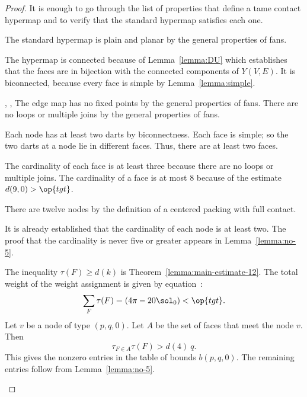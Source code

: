 \begin{proof} It is enough to go through the list of properties that
  define a tame contact hypermap and to verify that the standard
  hypermap satisfies each one.

\begin{nomerate}
\item {} The standard hypermap is plain and planar by the
  general properties of fans.
\item {} The hypermap is connected because of
  Lemma~\ref{lemma:DU} which establishes that the faces are in
  bijection with the connected components of $Y(V,E)$.  It is
  biconnected, because every face is simple by
  Lemma~\ref{lemma:simple}.  %
\item {}, ,  The
  edge map has no fixed points by the general properties of fans.
  There are no loops or multiple joins by the general properties of
  fans.
\item {} Each node has at least two darts by
  biconnectness. Each face is simple; so the two darts at a node lie
  in different faces.  Thus, there are at least two faces.
\item {} The cardinality of each face is at least three
  because there are no loops or multiple joins.  The cardinality of a
  face is at most $8$ because of the estimate $d(9,0)>\op{tgt}$.
\item {} There are twelve nodes by the definition of a
  centered packing with full contact.
\item {} It is already established that the cardinality
  of each node is at least two.  The proof that the cardinality is
  never five or greater appears in Lemma~\ref{lemma:no-5}.
\item {} The inequality $\tau(F)\ge d(k)$ is
  Theorem~\ref{lemma:main-estimate-12}.
  The total weight of the weight assignment is given by
  equation~:
\begin{displaymath}
\sum_F \tau(F) = (4\pi - 20\sol_0) < \op{tgt}.
\end{displaymath}
%
Let $v$ be a node of type $(p,q,0)$.  Let $A$ be the set of faces that
meet the node $v$. Then
\begin{displaymath}
\tau_{F\in A}\tau(F) > d(4)~q.
\end{displaymath}
This gives the nonzero entries in the table of bounds $b(p,q,0)$.  The
remaining entries follow from Lemma~\ref{lemma:no-5}.
\end{nomerate}
\end{proof}




